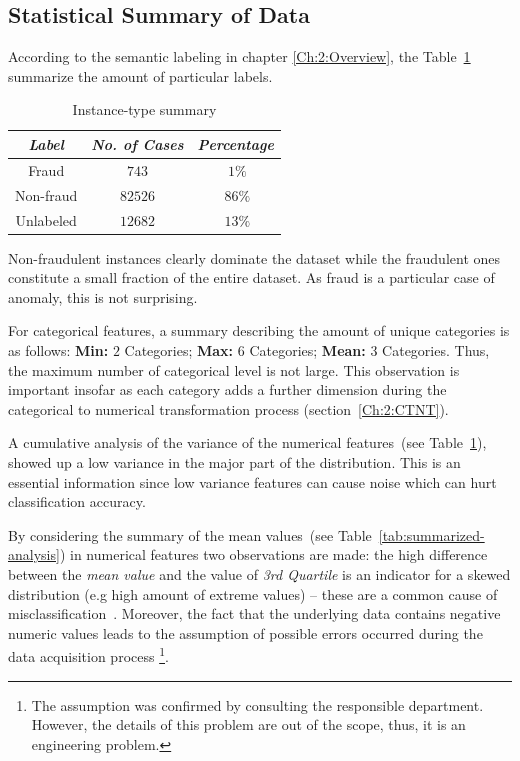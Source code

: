\subsection{Statistical Summary of Data}\label{Ch:2:SSummary}

According to the semantic labeling in chapter \ref{Ch:2:Overview}, the Table~\ref{tab:instance-summary} summarize the amount of particular labels.

\begin{table}[h!]
  \begin{center}
    \caption{Instance-type summary}
    \label{tab:instance-summary}
    \begin{tabular}{|c|c|c|}\hline
    \textit{Label} & \textit{No. of Cases} & \textit{Percentage} \\
      \hline
     Fraud & \(743\) & \(~1\%\) \\ 
     \hline
     Non-fraud & \(82526\) &  \(~86\%\) \\
     \hline
     Unlabeled & \(12682\) &  \(~13\%\) \\
     \hline
    \end{tabular}
  \end{center}
\end{table}

Non-fraudulent instances clearly dominate the dataset while the fraudulent ones constitute a small fraction of the entire dataset. As fraud is a particular case of anomaly, this is not surprising.

For categorical features, a summary describing the amount of unique categories is as follows: \textbf{Min:} \(2\) Categories; \textbf{Max:} \(6\) Categories; \textbf{Mean:} \(3\) Categories. Thus, the maximum number of categorical level is not large.
This observation is important insofar as each category adds a further dimension during the categorical to numerical transformation process (section~\ref{Ch:2:CTNT}).

A cumulative analysis of the variance of the numerical features~(see Table~\ref{tab:instance-summary}), showed up a low variance in the major part of the distribution. This is an essential information since low variance features can cause noise which can hurt classification accuracy. 

By considering the summary of the mean values~(see Table~\ref{tab:summarized-analysis}) in numerical features two observations are made: the high difference between the \textit{mean value} and the value of \textit{3rd Quartile} is an indicator for a skewed distribution (e.g high amount of extreme values) --  these are a common cause of misclassification~\cite{journals/adac/HubertV10}. Moreover, the fact that the underlying data contains negative numeric values leads to the assumption of possible errors occurred during the data acquisition process \footnote{The assumption was confirmed by consulting the responsible department. However, the details of this problem are out of the scope, thus, it is an engineering problem.}.

